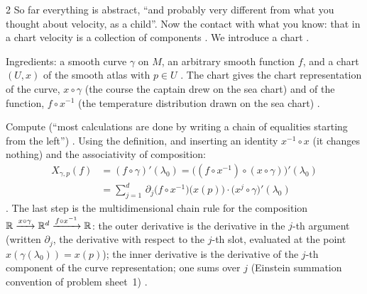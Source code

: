 \begin{paracol}{2}
So far everything is abstract, ``and probably very different from what you thought about velocity, as a child''. Now the
contact with what you know: that in a chart velocity is a collection of components .
We introduce a chart .

Ingredients: a smooth curve $\gamma$ on $M$, an arbitrary smooth function $f$, and a chart $(U,x)$ of the smooth atlas
with $p\in U$ . The chart gives the chart
representation of the curve, $x\circ\gamma$ (the course the captain drew on the sea chart) and of the function,
$f\circ x^{-1}$ (the temperature distribution drawn on the sea chart) .

Compute (``most calculations are done by writing a chain of equalities starting from the left'') .
Using the definition, and inserting an identity $x^{-1}\circ x$ (it changes nothing) and the associativity of composition:
\begin{align*}
  X_{\gamma,p}(f)&=(f\circ\gamma)'(\lambda_0)=\bigl((f\circ x^{-1})\circ(x\circ\gamma)\bigr)'(\lambda_0)\\
  &=\sum_{j=1}^d\,\partial_j\bigl(f\circ x^{-1}\bigr)\bigl(x(p)\bigr)\cdot\bigl(x^j\circ\gamma\bigr)'(\lambda_0)
\end{align*}
.
The last step is the multidimensional chain rule for the composition $\mathbb{R}\xrightarrow{x\circ\gamma}\mathbb{R}^d\xrightarrow{f\circ x^{-1}}\mathbb{R}$: the outer derivative is the
derivative in the $j$-th argument (written $\partial_j$, the derivative with respect to the $j$-th slot, evaluated at
the point $x(\gamma(\lambda_0))=x(p)$); the inner derivative is the derivative of the $j$-th component of the curve
representation; one sums over $j$ (Einstein summation convention of problem sheet~1)
.


\end{paracol}
